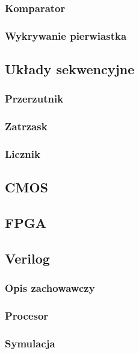 \documentclass[a4paper,12pt]{article}
\begin{document}
\subsubsection{Komparator}

\subsubsection{Wykrywanie pierwiastka}


\subsection{Układy sekwencyjne}

\subsubsection{Przerzutnik}

\subsubsection{Zatrzask}

\subsubsection{Licznik}


\subsection{CMOS}


\subsection{FPGA}


\subsection{Verilog}

\subsubsection{Opis zachowawczy}

\subsubsection{Procesor}

\subsubsection{Symulacja}
\end{document}
